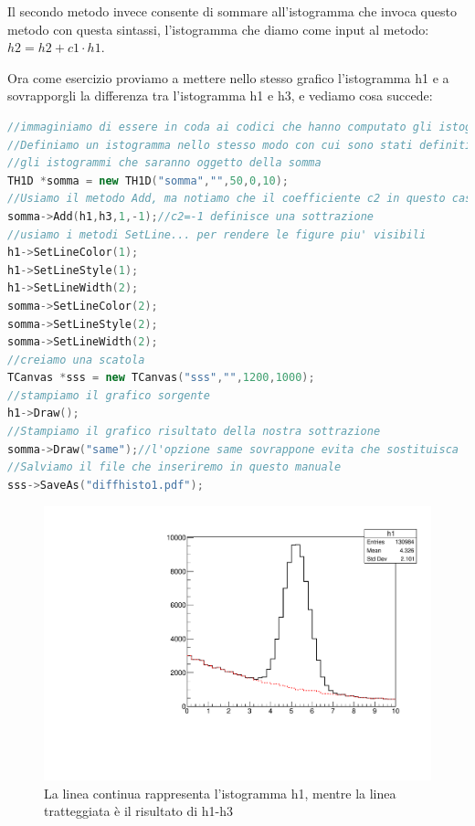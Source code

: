 \documentclass[11pt,fleqn]{book} %
\begin{document}
Il secondo metodo invece consente di sommare all'istogramma che invoca questo metodo con questa sintassi, l'istogramma che diamo come input al metodo: $h2 = h2 + c1 \cdot h1$.

Ora come esercizio proviamo a mettere nello stesso grafico l'istogramma h1 e a sovrapporgli la differenza tra l'istogramma h1 e h3, e vediamo cosa succede:


\begin{lstlisting}[language=c++]
//immaginiamo di essere in coda ai codici che hanno computato gli istogrammi
//Definiamo un istogramma nello stesso modo con cui sono stati definiti
//gli istogrammi che saranno oggetto della somma
TH1D *somma = new TH1D("somma","",50,0,10);
//Usiamo il metodo Add, ma notiamo che il coefficiente c2 in questo caso e' -1
somma->Add(h1,h3,1,-1);//c2=-1 definisce una sottrazione
//usiamo i metodi SetLine... per rendere le figure piu' visibili
h1->SetLineColor(1);
h1->SetLineStyle(1);
h1->SetLineWidth(2);
somma->SetLineColor(2);
somma->SetLineStyle(2);
somma->SetLineWidth(2);
//creiamo una scatola
TCanvas *sss = new TCanvas("sss","",1200,1000);
//stampiamo il grafico sorgente
h1->Draw();
//Stampiamo il grafico risultato della nostra sottrazione
somma->Draw("same");//l'opzione same sovrappone evita che sostituisca
//Salviamo il file che inseriremo in questo manuale
sss->SaveAs("diffhisto1.pdf");
\end{lstlisting}


\begin{figure}[h]
\centering
\includegraphics[scale=0.5]{Pictures/diffhisto1.pdf}
\caption{La linea continua rappresenta l'istogramma h1, mentre la linea tratteggiata è il risultato di h1-h3 \label{diff}}
\end{figure}
\end{document}
